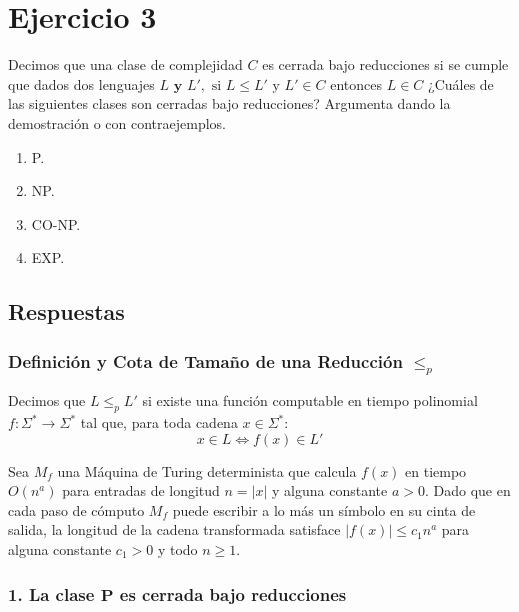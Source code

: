 \section{Ejercicio 3}


\begin{tcolorbox}[enunciado]
Decimos que una clase de complejidad $C$ es cerrada bajo reducciones si se cumple que dados dos lenguajes $L \textbf{ y } L', \text{ si } L \leq L' \text{ y } L' \in C$ entonces $L  \in C$ ¿Cuáles de las siguientes clases son cerradas bajo reducciones? Argumenta dando la demostración o con contraejemplos.
\begin{enumerate}
    \item P.
    \item NP.
    \item CO-NP.
    \item EXP.
\end{enumerate}
\end{tcolorbox}

\subsection{Respuestas}

\subsubsection*{Definición y Cota de Tamaño de una Reducción $\le_p$}

Decimos que $L \le_p L'$ si existe una función computable en tiempo polinomial $f: \Sigma^* \to \Sigma^*$ tal que, para toda cadena $x \in \Sigma^*$:
\[ x \in L \iff f(x) \in L' \]

Sea $M_f$ una Máquina de Turing determinista que calcula $f(x)$ en tiempo $O(n^a)$ para entradas de longitud $n = |x|$ y alguna constante $a > 0$. Dado que en cada paso de cómputo $M_f$ puede escribir a lo más un símbolo en su cinta de salida, la longitud de la cadena transformada satisface $|f(x)| \le c_1 n^a$ para alguna constante $c_1 > 0$ y todo $n \ge 1$.

\subsubsection*{1. La clase $\mathbf{P}$ es cerrada bajo reducciones}

